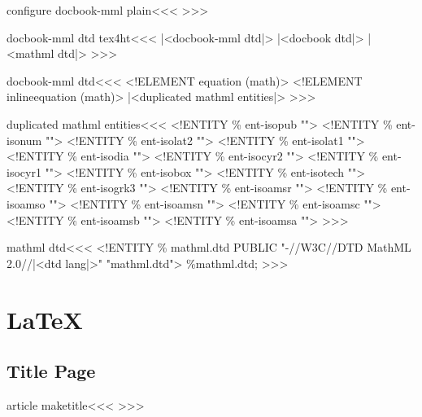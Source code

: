 \<configure docbook-mml plain\><<< 
   {}
   {}
>>>



\<docbook-mml dtd tex4ht\><<<
|<docbook-mml dtd|>%
|<docbook dtd|>%
|<mathml dtd|>%
>>>


\<docbook-mml dtd\><<<
<!ELEMENT equation (math)>\Hnewline
<!ELEMENT inlineequation (math)>\Hnewline
|<duplicated mathml entities|>%
>>>

\<duplicated mathml entities\><<<
<!ENTITY \% ent-isopub  "">
<!ENTITY \% ent-isonum  "">\Hnewline    
<!ENTITY \% ent-isolat2  "">
<!ENTITY \% ent-isolat1  "">\Hnewline    
<!ENTITY \% ent-isodia  "">
<!ENTITY \% ent-isocyr2  "">\Hnewline    
<!ENTITY \% ent-isocyr1  "">
<!ENTITY \% ent-isobox  "">\Hnewline    
<!ENTITY \% ent-isotech  "">
<!ENTITY \% ent-isogrk3  "">\Hnewline    
<!ENTITY \% ent-isoamsr  "">
<!ENTITY \% ent-isoamso  "">\Hnewline    
<!ENTITY \% ent-isoamsn  "">
<!ENTITY \% ent-isoamsc  "">\Hnewline    
<!ENTITY \% ent-isoamsb  "">
<!ENTITY \% ent-isoamsa  "">\Hnewline  
>>>



\<mathml dtd\><<<
<!ENTITY \% mathml.dtd PUBLIC
    "-//W3C//DTD MathML 2.0//|<dtd lang|>"\Hnewline\space\space
    "mathml.dtd">  
    \Hnewline \%mathml.dtd;\Hnewline
>>>







\chapter{LaTeX}





\section{Title Page}

\<article maketitle\><<<
   {}
   {}
   {}{}
 {}{}
   {}
   {}
   {}
   {}
   {}{}
>>>

